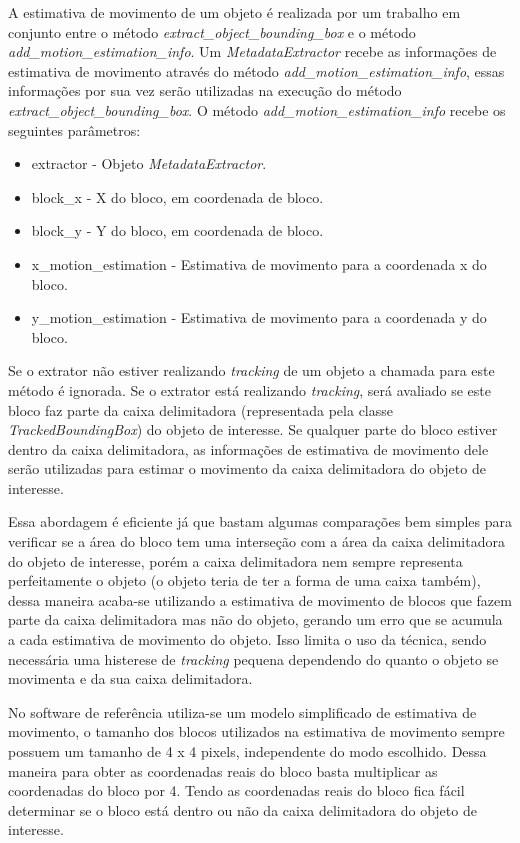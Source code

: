 A estimativa de movimento de um objeto é realizada por um trabalho em conjunto entre o método \textit{extract\_object\_bounding\_box} e o método \textit{add\_motion\_estimation\_info}. Um \textit{MetadataExtractor} recebe as informações de estimativa de movimento através do método \textit{add\_motion\_estimation\_info}, essas informações por sua vez serão utilizadas na execução do método \textit{extract\_object\_bounding\_box}. O método \textit{add\_motion\_estimation\_info} recebe os seguintes parâmetros:

\begin{itemize}
	\item extractor - Objeto \textit{MetadataExtractor}.
        \item block\_x - X do bloco, em coordenada de bloco.
        \item block\_y - Y do bloco, em coordenada de bloco.
        \item x\_motion\_estimation - Estimativa de movimento para a coordenada x do bloco.
        \item y\_motion\_estimation - Estimativa de movimento para a coordenada y do bloco.
\end{itemize}

Se o extrator não estiver realizando \textit{tracking} de um objeto a chamada para este método é ignorada. Se o extrator está realizando \textit{tracking}, será avaliado se este bloco faz parte da caixa delimitadora (representada pela classe \textit{TrackedBoundingBox}) do objeto de interesse. Se qualquer parte do bloco estiver dentro da caixa delimitadora, as informações de estimativa de movimento dele serão utilizadas para estimar o movimento da caixa delimitadora do objeto de interesse.

Essa abordagem é eficiente já que bastam algumas comparações bem simples para verificar se a área do bloco tem uma interseção com a área da caixa delimitadora do objeto de interesse, porém a caixa delimitadora nem sempre representa perfeitamente o objeto (o objeto teria de ter a forma de uma caixa também), dessa maneira acaba-se utilizando a estimativa de movimento de blocos que fazem parte da caixa delimitadora mas não do objeto, gerando um erro que se acumula a cada estimativa de movimento do objeto. Isso limita o uso da técnica, sendo necessária uma histerese de \textit{tracking} pequena dependendo do quanto o objeto se movimenta e da sua caixa delimitadora.

No software de referência utiliza-se um modelo simplificado de estimativa de movimento, o tamanho dos blocos utilizados na estimativa de movimento sempre possuem um tamanho de 4 x 4 pixels, independente do modo escolhido. Dessa maneira para obter as coordenadas reais do bloco basta multiplicar as coordenadas do bloco por 4. Tendo as coordenadas reais do bloco fica fácil determinar se o bloco está dentro ou não da caixa delimitadora do objeto de interesse.


